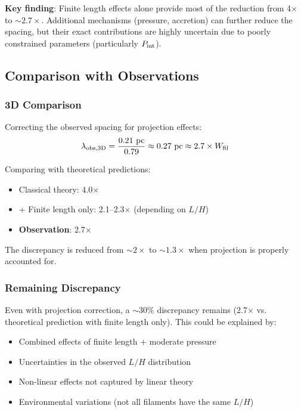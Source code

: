 \documentclass[11pt,a4paper]{article}
\begin{document}
\noindent\textbf{Key finding}: Finite length effects alone provide most of the reduction from 4$\times$ to $\sim2.7\times$. Additional mechanisms (pressure, accretion) can further reduce the spacing, but their exact contributions are highly uncertain due to poorly constrained parameters (particularly $P_{\rm int}$).

\subsection{Comparison with Observations}

\subsubsection{3D Comparison}

Correcting the observed spacing for projection effects:
\begin{equation}
\lambda_{\rm obs,3D} = \frac{0.21~{\rm pc}}{0.79} \approx 0.27~{\rm pc} \approx 2.7 \times W_{\rm fil}
\end{equation}

Comparing with theoretical predictions:
\begin{itemize}
    \item Classical theory: 4.0$\times$
    \item + Finite length only: 2.1--2.3$\times$ (depending on $L/H$)
    \item \textbf{Observation}: 2.7$\times$
\end{itemize}

The discrepancy is reduced from $\sim2\times$ to $\sim1.3\times$ when projection is properly accounted for.

\subsubsection{Remaining Discrepancy}

Even with projection correction, a $\sim30\%$ discrepancy remains (2.7$\times$ vs. theoretical prediction with finite length only). This could be explained by:
\begin{itemize}
    \item Combined effects of finite length + moderate pressure
    \item Uncertainties in the observed $L/H$ distribution
    \item Non-linear effects not captured by linear theory
    \item Environmental variations (not all filaments have the same $L/H$)
\end{itemize}
\end{document}
